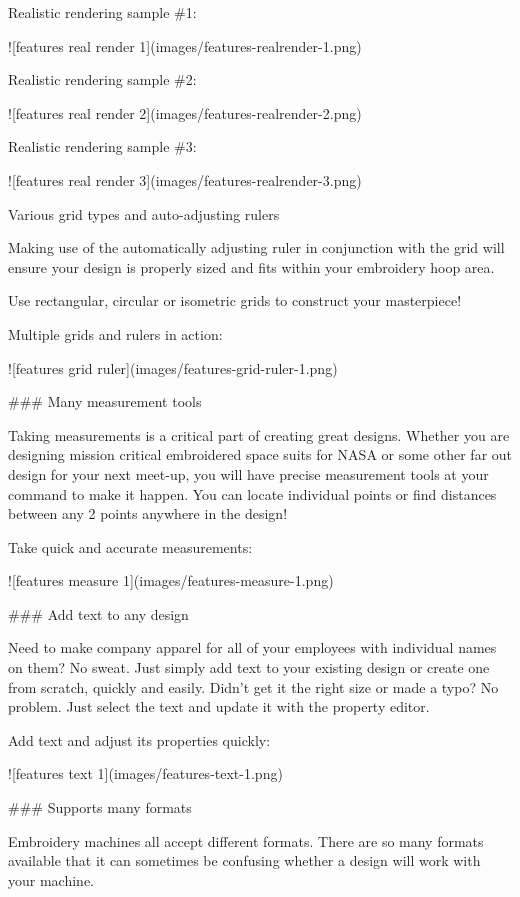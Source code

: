 Realistic rendering sample \#1:

![features real render 1](images/features-realrender-1.png)

Realistic rendering sample \#2:

![features real render 2](images/features-realrender-2.png)

Realistic rendering sample \#3:

![features real render 3](images/features-realrender-3.png)

Various grid types and auto-adjusting rulers

Making use of the automatically adjusting ruler in conjunction with the grid will ensure your
design is properly sized and fits within your embroidery hoop area.

Use rectangular, circular or isometric grids to construct your masterpiece!

Multiple grids and rulers in action:

![features grid ruler](images/features-grid-ruler-1.png)

### Many measurement tools

Taking measurements is a critical part of creating great designs. Whether you are designing
mission critical embroidered space suits for NASA or some other far out design for your next
meet-up, you will have precise measurement tools at your command to make it happen. You can
locate individual points or find distances between any 2 points anywhere in the design!

Take quick and accurate measurements:

![features measure 1](images/features-measure-1.png)

### Add text to any design

Need to make company apparel for all of your employees with individual names on them? No sweat.
Just simply add text to your existing design or create one from scratch, quickly and easily.
Didn't get it the right size or made a typo? No problem. Just select the text and update it
with the property editor.

Add text and adjust its properties quickly:

![features text 1](images/features-text-1.png)

### Supports many formats

Embroidery machines all accept different formats. There are so many formats available that it
can sometimes be confusing whether a design will work with your machine.

